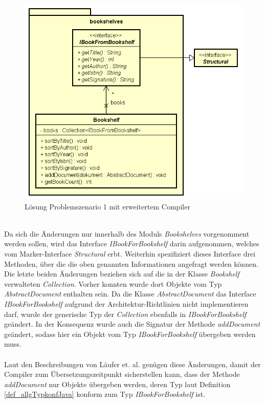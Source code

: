 \documentclass[11pt, 
ngerman,
doublespacing,
chapterinoneline, %
consistentlayout, %
]{scrartcl}
\begin{document}
\begin{figure}[h]
\label{cd_loesungProblem1_compiler}
\centering
\includegraphics[scale=0.5]{pics/cd_loesungProblem1_compiler}
\caption{Lösung Problemszenario 1 mit erweitertem Compiler}
\end{figure}\\
Da sich die Änderungen nur innerhalb des Moduls \emph{Bookshelves} vorgenomment werden sollen, wird das Interface \emph{IBookForBookshelf} darin aufgenommen, welches vom Marker-Interface \emph{Structural} erbt. Weiterhin spezifiziert dieses Interface drei Methoden, über die die oben genannten Informationen angefragt werden können. Die letzte beiden Änderungen beziehen sich auf die in der Klasse \emph{Bookshelf} verwalteten \emph{Collection}. Vorher konnten wurde dort Objekte vom Typ \emph{AbstractDocument} enthalten sein. Da die Klasse \emph{AbstractDocument} das Interface \emph{IBookForBookshelf} aufgrund der Architektur-Richtlinien nicht implementieren darf, wurde der generische Typ der \emph{Collection} ebenfalls in \emph{IBookForBookshelf} geändert. In der Konsequenz wurde auch die Signatur der Methode \emph{addDocument} geändert, sodass hier ein Objekt vom Typ \emph{IBookForBookshelf} übergeben werden muss.\\\\
Laut den Beschreibungen von Läufer et. al. \cite{structconfjava} genügen diese Änderungen, damit der Compiler zum Übersetzungszeitpunkt sicherstellen kann, dass der Methode \emph{addDocument} nur Objekte übergeben werden, deren Typ laut Definition \ref{def_allgTypkonfJava} konform zum Typ \emph{IBookForBookshelf} ist.
\end{document}

